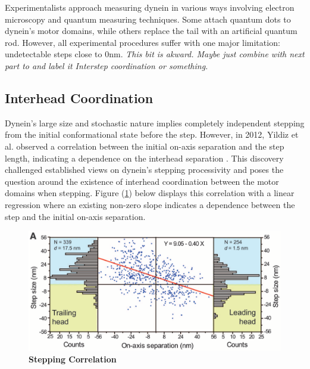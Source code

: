 Experimentalists approach measuring dynein in various ways involving electron microscopy and quantum measuring techniques. Some attach quantum dots to dynein's motor domains, while others replace the tail with an artificial quantum rod. However, all experimental procedures suffer with one major limitation: undetectable steps close to 0nm. \textit{This bit is akward. Maybe just combine with next part to and label it Interstep coordination or something.}


\subsection{Interhead Coordination}

Dynein's large size and stochastic nature implies completely independent stepping from the initial conformational state before the step. However, in 2012, Yildiz et al. observed a correlation between the initial on-axis separation and the step length, indicating a dependence on the interhead separation \cite{Dewitt2012}. This discovery challenged established views on dynein's stepping processivity and poses the question around the existence of interhead coordination between the motor domains when stepping. Figure (\ref{fig:YildizCorrelation}) below displays this correlation with a linear regression where an existing non-zero slope indicates a dependence between the step and the initial on-axis separation.

\begin{figure}[H]
	\centering
	\includegraphics[width=1\columnwidth]{Figures/Yildiz_stepping.png}
	\caption[Stepping Correlation]{\textbf{Stepping Correlation}  \cite{Dewitt2012} }
	\label{fig:YildizCorrelation}
\end{figure}


